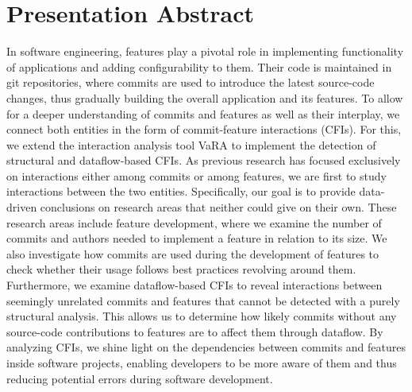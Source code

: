 \begingroup
\let\clearpage\relax
\let\cleardoublepage\relax
\let\cleardoublepage\relax

\section*{Presentation Abstract}\label{ch:abstract}

In software engineering, features play a pivotal role in implementing functionality of applications and adding configurability to them.
Their code is maintained in git repositories, where commits are used to introduce the latest source-code changes, thus gradually building the overall application and its features.
To allow for a deeper understanding of commits and features as well as their interplay, we connect both entities in the form of commit-feature interactions (CFIs). 
For this, we extend the interaction analysis tool VaRA to implement the detection of structural and dataflow-based CFIs.
As previous research has focused exclusively on interactions either among commits or among features, we are first to study interactions between the two entities.
Specifically, our goal is to provide data-driven conclusions on research areas that neither could give on their own.
These research areas include feature development, where we examine the number of commits and authors needed to implement a feature in relation to its size. 
We also investigate how commits are used during the development of features to check whether their usage follows best practices revolving around them. 
Furthermore, we examine dataflow-based CFIs to reveal interactions between seemingly unrelated commits and features that cannot be detected with a purely structural analysis.
This allows us to determine how likely commits without any source-code contributions to features are to affect them through dataflow.
By analyzing CFIs, we shine light on the dependencies between commits and features inside software projects, enabling developers to be more aware of them and thus reducing potential errors during software development.

\iffalse

